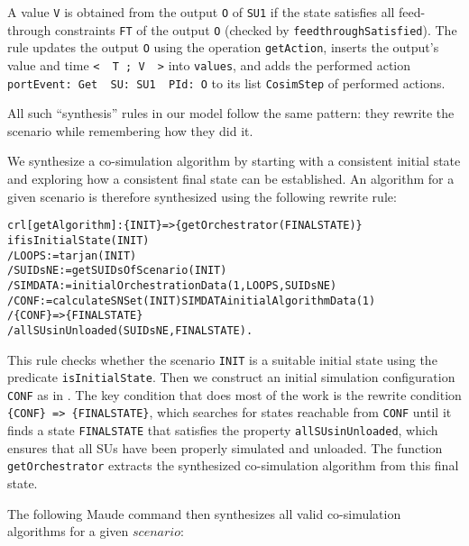 \noindent 
A value \texttt{V} is obtained from the output \texttt{O} of 
\texttt{SU1} if the  state satisfies all  feed-through
constraints \texttt{FT} of the output \texttt{O} (checked by
\texttt{feedthroughSatisfied}). 
The rule updates the output \texttt{O} using the operation
\texttt{getAction}, inserts the output's value and time
\texttt{<\,\,T\,;\,V\,\,>} into  \texttt{values}, and 
adds the performed
action \texttt{portEvent:\,Get\,\,SU:\,SU1\,\,PId:\,O} to its list
\texttt{CosimStep} of
performed actions. 

All such ``synthesis'' rules in our model follow the same pattern: 
they rewrite the scenario while remembering how they did it.

We  synthesize a co-simulation algorithm by starting with a
consistent initial state and exploring how a consistent final state can
be established. 
An algorithm for a given scenario is therefore synthesized using the
following rewrite rule: 

\small
\begin{alltt}
crl [getAlgorithm]: \{INIT\} => \{getOrchestrator(FINALSTATE)\}
if isInitialState(INIT)
   / LOOPS := tarjan(INIT)
   / SUIDsNE := getSUIDsOfScenario(INIT)
   / SIMDATA := initialOrchestrationData(1,LOOPS,SUIDsNE)
   / CONF := calculateSNSet(INIT) SIMDATA initialAlgorithmData(1)
   / \{CONF\} => \{FINALSTATE\} 
   / allSUsinUnloaded(SUIDsNE, FINALSTATE) .
\end{alltt}
\normalsize

\noindent 
This rule checks whether the scenario \texttt{INIT} is
 a suitable initial state using the predicate
\texttt{isInitialState}. 
Then we construct an initial simulation configuration \texttt{CONF} as
in . 
The key condition that does most of the work is the rewrite condition
\texttt{\{CONF\} => \{FINALSTATE\}}, which searches for states
reachable from \texttt{CONF} until it finds a state
\texttt{FINALSTATE} that satisfies the property
\texttt{allSUsinUnloaded}, which ensures that all SUs have been
properly simulated and unloaded. 
The function \texttt{getOrchestrator} extracts the synthesized
co-simulation algorithm from this final state. 

  The following Maude command then synthesizes all valid co-simulation
  algorithms for  a given \(\mathit{scenario}\):

